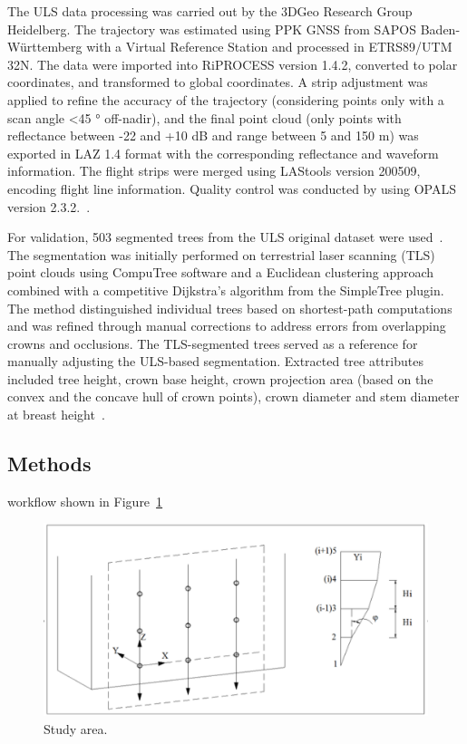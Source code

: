 \documentclass{isprs} %
\begin{document}
The ULS data processing was carried out by the 3DGeo Research Group Heidelberg. The trajectory was estimated using PPK GNSS from SAPOS Baden-Württemberg with a Virtual Reference Station and processed in ETRS89/UTM 32N. The data were imported into RiPROCESS version 1.4.2, converted to polar coordinates, and transformed to global coordinates. A strip adjustment was applied to refine the accuracy of the trajectory (considering points only with a scan angle \textless 45 ° off-nadir), and the final point cloud (only points with reflectance between -22 and +10 dB and range between 5 and 150 m) was exported in LAZ 1.4 format with the corresponding reflectance and waveform information. The flight strips were merged using LAStools version 200509, encoding flight line information. Quality control was conducted by using OPALS version 2.3.2.~\cite{Weiser2022b}.

For validation, 503 segmented trees from the ULS original dataset were used~\cite{Weiser2022a}. The segmentation was initially performed on terrestrial laser scanning (TLS) point clouds using CompuTree software and a Euclidean clustering approach combined with a competitive Dijkstra’s algorithm from the SimpleTree plugin. The method distinguished individual trees based on shortest-path computations and was refined through manual corrections to address errors from overlapping crowns and occlusions. The TLS-segmented trees served as a reference for manually adjusting the ULS-based segmentation. Extracted tree attributes included tree height, crown base height, crown projection area (based on the convex and the concave hull of crown points), crown diameter and stem diameter at breast height~\cite{Weiser2022b}.

\subsection{Methods}\label{sec:Method}



workflow shown in Figure~\ref{fig:figure workflow}

\begin{figure}[ht!]
\begin{center}
		\includegraphics[width=1.0\columnwidth]{figures/test_sites/fig1.eps}
	\caption{Study area.}
\label{fig:figure workflow}
\end{center}
\end{figure}
\end{document}

